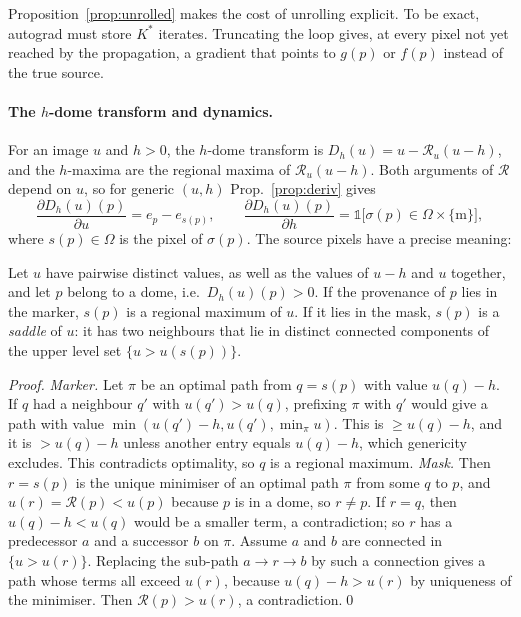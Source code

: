 \documentclass[runningheads]{llncs}
\newcommand{\Rec}{\mathcal{R}}
\newcommand{\dom}{\Omega}
\newcommand{\src}{\sigma}
\begin{document}
Proposition~\ref{prop:unrolled} makes the cost of unrolling explicit. To be exact, autograd must store $K^\ast$ iterates. Truncating the loop gives, at every pixel not yet reached by the propagation, a gradient that points to $g(p)$ or $f(p)$ instead of the true source.

\paragraph{The $h$-dome transform and dynamics.} For an image $u$ and $h>0$, the $h$-dome transform is $D_h(u)=u-\Rec_u(u-h)$, and the $h$-maxima are the regional maxima of $\Rec_u(u-h)$. Both arguments of $\Rec$ depend on $u$, so for generic $(u,h)$ Prop.~\ref{prop:deriv} gives
\begin{equation}
\frac{\partial D_h(u)(p)}{\partial u}=e_p-e_{s(p)},\qquad \frac{\partial D_h(u)(p)}{\partial h}=\mathbb 1\big[\src(p)\in\dom\times\{\mathrm m\}\big],\label{eq:hdome}
\end{equation}
where $s(p)\in\dom$ is the pixel of $\src(p)$. The source pixels have a precise meaning:

\begin{proposition}\label{prop:hdome}
Let $u$ have pairwise distinct values, as well as the values of $u-h$ and $u$ together, and let $p$ belong to a dome, i.e.\ $D_h(u)(p)>0$. If the provenance of $p$ lies in the marker, $s(p)$ is a regional maximum of $u$. If it lies in the mask, $s(p)$ is a \emph{saddle} of $u$: it has two neighbours that lie in distinct connected components of the upper level set $\{u>u(s(p))\}$.
\end{proposition}
\begin{proof}
\emph{Marker.} Let $\pi$ be an optimal path from $q=s(p)$ with value $u(q)-h$. If $q$ had a neighbour $q'$ with $u(q')>u(q)$, prefixing $\pi$ with $q'$ would give a path with value $\min(u(q')-h,u(q'),\min_\pi u)$. This is $\ge u(q)-h$, and it is $>u(q)-h$ unless another entry equals $u(q)-h$, which genericity excludes. This contradicts optimality, so $q$ is a regional maximum. \emph{Mask.} Then $r=s(p)$ is the unique minimiser of an optimal path $\pi$ from some $q$ to $p$, and $u(r)=\Rec(p)<u(p)$ because $p$ is in a dome, so $r\ne p$. If $r=q$, then $u(q)-h<u(q)$ would be a smaller term, a contradiction; so $r$ has a predecessor $a$ and a successor $b$ on $\pi$. Assume $a$ and $b$ are connected in $\{u>u(r)\}$. Replacing the sub-path $a\to r\to b$ by such a connection gives a path whose terms all exceed $u(r)$, because $u(q)-h>u(r)$ by uniqueness of the minimiser. Then $\Rec(p)>u(r)$, a contradiction.\qed
\end{proof}
\end{document}
